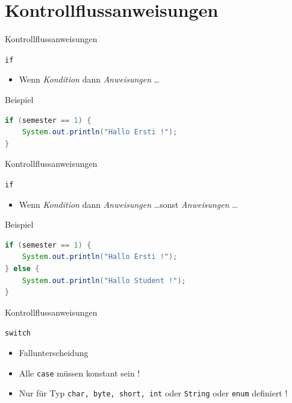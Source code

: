 \documentclass[18pt]{beamer}
\begin{document}
\section{Kontrollflussanweisungen}

\begin{frame}[fragile]{Kontrollflussanweisungen}
    \begin{block}{\texttt{if}}
        \begin{itemize}
            \item Wenn \textit{Kondition} dann \textit{Anweisungen} \dots
        \end{itemize}
    \end{block}
    \pause
    \begin{exampleblock}{Beispiel}
            \begin{lstlisting}[language=Java]
if (semester == 1) {
    System.out.println("Hallo Ersti !");
}
            \end{lstlisting}
    \end{exampleblock}
\end{frame}

\begin{frame}[fragile]{Kontrollflussanweisungen}
    \begin{block}{\texttt{if}}
        \begin{itemize}
            \item Wenn \textit{Kondition} dann \textit{Anweisungen} \dots sonst \textit{Anweisungen} \dots
        \end{itemize}
    \end{block}
    \pause
    \begin{exampleblock}{Beispiel}
            \begin{lstlisting}[language=Java]
if (semester == 1) {
    System.out.println("Hallo Ersti !");
} else {
    System.out.println("Hallo Student !");
}
            \end{lstlisting}
    \end{exampleblock}
\end{frame}

\begin{frame}[fragile]{Kontrollflussanweisungen}
    \begin{block}{\texttt{switch}}
        \begin{itemize}
            \item Fallunterscheidung
            \item Alle \texttt{case} müssen konstant sein !
            \item Nur für Typ \texttt{char, byte, short, int} oder \texttt{String} oder \texttt{enum} definiert !
        \end{itemize}
    \end{block}
\end{frame}
\end{document}
